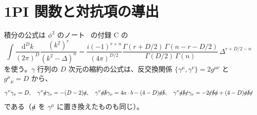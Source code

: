\documentclass[a4paper,10pt]{ltjsarticle}
\newcommand{\dd}{\mathrm{d}}
\begin{document}
\section{1PI 関数と対抗項の導出}\label{app:ren}

積分の公式は $\phi^3$ のノート~\cite{phi3note} の付録 C の
\begin{equation*}
\int\frac{\dd^Dk}{(2\pi)^D}\frac{(k^2)^r}{(k^2-\Delta)^n}=\frac{i(-1)^{r+n}}{(4\pi)^{D/2}}\frac{\Gamma(r+D/2)\,\Gamma(n-r-D/2)}{\Gamma(D/2)\,\Gamma(n)}\,\Delta^{r+D/2-n}
\end{equation*}
を使う。$\gamma$ 行列の $D$ 次元の縮約の公式は、反交換関係 $\{\gamma^\mu,\gamma^\nu\}=2g^{\mu\nu}$ と $g^\mu{}_\mu=D$ から、
\begin{equation*}
\gamma^\nu\gamma_\nu=D,\quad
\gamma^\nu\slashed a\gamma_\nu=-(D-2)\slashed a,\quad
\gamma^\nu\slashed a\slashed b\gamma_\nu=4a\cdot b-(4-D)\slashed a\slashed b,\quad
\gamma^\nu\slashed a\slashed b\slashed c\gamma_\nu=-2\slashed c\slashed b\slashed a+(4-D)\slashed a\slashed b\slashed c
\end{equation*}
である（$\slashed a$ を $\gamma^\mu$ に置き換えたものも同じ）。
\end{document}
